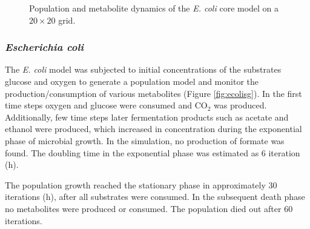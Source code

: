\begin{figure}[h!]
{\begin{minipage}[t]{0.3\textwidth}
  \end{minipage}
  }
  \caption{Population and metabolite dynamics of the \emph{E. coli} core model on a $20\times20$ grid.}
  \label{fig:ecoregrids}
\end{figure}

\subsubsection{\textit{Escherichia coli}}
The \textit{E. coli} model was subjected to initial concentrations of the substrates glucose and oxygen to generate a population model and monitor the production/consumption of various metabolites (Figure \hyperref[fig:ecolisg]{\ref{fig:ecolisg}}). In the first time steps oxygen and glucose were consumed and CO$_2$ was produced. Additionally, few time steps later fermentation products such as acetate and ethanol were produced, which increased in concentration during the exponential phase of microbial growth. In the simulation, no production of formate was found. The doubling time in the exponential phase was estimated as 6 iteration (h).

The population growth reached the stationary phase in approximately 30 iterations (h), after all substrates were consumed. In the subsequent death phase no metabolites were produced or consumed. The population died out after 60 iterations.

